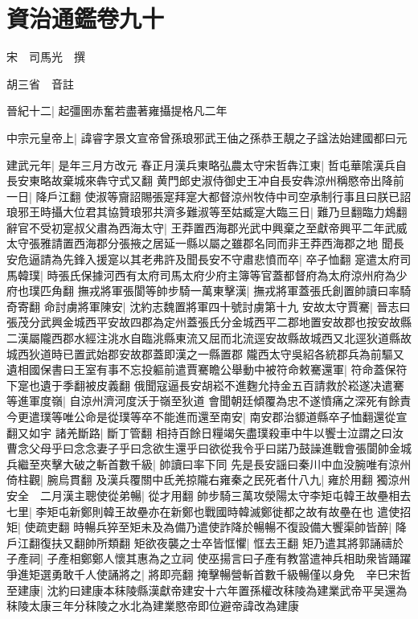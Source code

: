\section{資治通鑑卷九十}
宋　司馬光　撰

胡三省　音註

晉紀十二|{
	起彊圉赤奮若盡著雍攝提格凡二年}


中宗元皇帝上|{
	諱睿字景文宣帝曾孫琅邪武王伷之孫恭王靚之子諡法始建國都曰元}


建武元年|{
	是年三月方改元}
春正月漢兵東略弘農太守宋哲犇江東|{
	哲屯華隂漢兵自長安東略故棄城來犇守式又翻}
黄門郎史淑侍御史王冲自長安犇涼州稱愍帝出降前一日|{
	降戶江翻}
使淑等齎詔賜張寔拜寔大都督涼州牧侍中司空承制行事且曰朕已詔琅邪王時攝大位君其協贊琅邪共濟多難淑等至姑臧寔大臨三日|{
	難乃旦翻臨力鴆翻}
辭官不受初寔叔父肅為西海太守|{
	王莽置西海郡光武中興棄之至獻帝興平二年武威太守張雅請置西海郡分張掖之居延一縣以屬之雖郡名同而非王莽西海郡之地}
聞長安危逼請為先鋒入援寔以其老弗許及聞長安不守肅悲憤而卒|{
	卒子恤翻}
寔遣太府司馬韓璞|{
	時張氏保據河西有太府司馬太府少府主簿等官蓋都督府為太府涼州府為少府也璞匹角翻}
撫戎將軍張閬等帥步騎一萬東擊漢|{
	撫戎將軍蓋張氏創置帥讀曰率騎奇寄翻}
命討虜將軍陳安|{
	沈約志魏置將軍四十號討虜第十九}
安故太守賈騫|{
	晉志曰張茂分武興金城西平安故四郡為定州蓋張氏分金城西平二郡地置安故郡也按安故縣二漢屬隴西郡水經注洮水自臨洮縣東流又屈而北流逕安故縣故城西又北逕狄道縣故城西狄道時已置武始郡安故郡蓋即漢之一縣置郡}
隴西太守吳紹各統郡兵為前驅又遺相國保書曰王室有事不忘投軀前遣賈騫瞻公舉動中被符命敕騫還軍|{
	符命蓋保符下寔也遺于季翻被皮義翻}
俄聞寇逼長安胡崧不進麴允持金五百請救於崧遂决遣騫等進軍度嶺|{
	自涼州濟河度沃于嶺至狄道}
會聞朝廷傾覆為忠不遂憤痛之深死有餘責今更遣璞等唯公命是從璞等卒不能進而還至南安|{
	南安郡治䝠道縣卒子恤翻還從宣翻又如宇}
諸羌斷路|{
	斷丁管翻}
相持百餘日糧竭矢盡璞殺車中牛以饗士泣謂之曰汝曹念父母乎曰念念妻子乎曰念欲生還乎曰欲從我令乎曰諾乃鼓譟進戰會張閬帥金城兵繼至夾擊大破之斬首數千級|{
	帥讀曰率下同}
先是長安謡曰秦川中血没腕唯有涼州倚柱觀|{
	腕烏貫翻}
及漢兵覆關中氐羌掠隴右雍秦之民死者什八九|{
	雍於用翻}
獨涼州安全　二月漢主聰使從弟暢|{
	從才用翻}
帥步騎三萬攻滎陽太守李矩屯韓王故壘相去七里|{
	李矩屯新鄭則韓王故壘亦在新鄭也戰國時韓滅鄭徙都之故有故壘在也}
遣使招矩|{
	使疏吏翻}
時暢兵猝至矩未及為備乃遣使詐降於暢暢不復設備大饗渠帥皆醉|{
	降戶江翻復扶又翻帥所類翻}
矩欲夜襲之士卒皆恇懼|{
	恇去王翻}
矩乃遣其將郭誦禱於子產祠|{
	子產相鄭鄭人懷其惠為之立祠}
使巫揚言曰子產有教當遣神兵相助衆皆踊躍爭進矩選勇敢千人使誦將之|{
	將即亮翻}
掩擊暢營斬首數千級暢僅以身免　辛巳宋哲至建康|{
	沈約曰建康本秣陵縣漢獻帝建安十六年置孫權改秣陵為建業武帝平吴還為秣陵太康三年分秣陵之水北為建業愍帝即位避帝諱改為建康}
